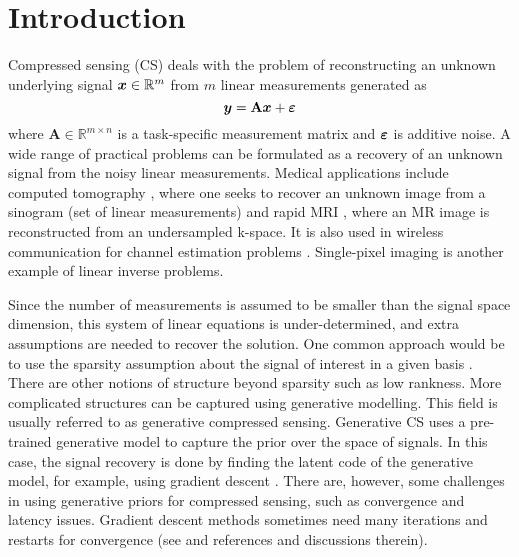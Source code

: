 

\section{Introduction}
Compressed sensing (CS) deals with the problem of reconstructing an unknown underlying signal ${\bm{x}} \in \mathbb{R}^m$ from $m$ linear measurements generated as
\begin{equation} \label{eq:cs_main}
    \vy = \mathbf{A}\vx + \vepsilon
\end{equation}
where $\mathbf{A} \in \mathbb{R}^{m\times n}$ is a task-specific measurement matrix and ${\bm{\varepsilon}}$ is additive noise. A wide range of practical problems can be formulated as a recovery of an unknown signal from the noisy linear measurements.
Medical applications include computed tomography \citep{chen2008prior}, where one seeks to recover an unknown image from a sinogram (set of linear measurements) and rapid MRI \citep{lustig2007sparse}, where an MR image is reconstructed from an undersampled k-space. It is also used in wireless communication for channel estimation problems \citep{paredes2007ultra}. Single-pixel imaging \citep{duarte2008single} is another example of linear inverse problems.

Since the number of measurements is assumed to be smaller than the signal space dimension, this system of linear equations is under-determined, and extra assumptions are needed to recover the solution. One common approach would be to use the sparsity assumption about the signal of interest in a given basis \citep{tibshirani1996regression,candes_stable_2006,donoho_compressed_2006}. There are other notions of structure beyond sparsity such as low rankness. More complicated structures can be captured using generative modelling. This field is usually referred to as generative compressed sensing. Generative CS  uses a pre-trained generative model to capture the prior over the space of signals. In this case, the signal recovery is done by finding the latent code of the generative model, for example, using gradient descent \cite{Bora2017-as}. There are, however, some challenges in using generative priors for compressed sensing, such as convergence and latency issues. Gradient descent methods sometimes need many iterations and restarts for convergence (see \cite{Whang2021-if} and references and discussions therein).

